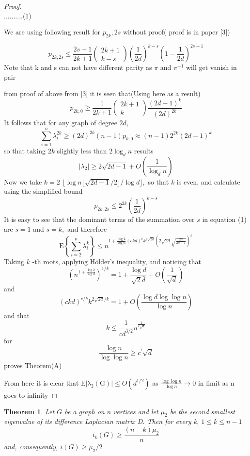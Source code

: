 \documentclass[oneside]{book}
\newtheorem{theorem}{Theorem}[section]
\begin{document}
\begin{proof}
$$		$$    ..........(1)\par
		We are using following result for $p_{2k},{2s}$ without proof( proof is in paper [3])  \par
		$$
		p_{2 k, 2 s} \leq \frac{2 s+1}{2 k+1}\left(\begin{array}{c}
		2 k+1 \\
		k-s
		\end{array}\right)\left(\frac{1}{2 d}\right)^{k-s}\left(1-\frac{1}{2 d}\right)^{2 s-1}
		$$
		Note that k and s can not have different parity as  $\pi$ and $\pi^{-1}$ will get vanish in pair\par
		from proof of above from [3] it is seen that(Using here as a result)  
		$$ p_{2 k, 0} \geq \frac{1}{2 k+1}\left(\begin{array}{c}
		2 k+1 \\
		k
		\end{array}\right) \frac{(2 d-1)^{k}}{(2 d)^{2 k}}$$
		It follows that for any graph of degree $2 d$,
		$$
		\sum_{i=1}^{n} \lambda_{i}^{2 k} \geq(2 d)^{2 k}(n-1) p_{k, 0} \approx(n-1) 2^{2 k}(2 d-1)^{k}
		$$
		so that taking $2 k$ slightly less than $2 \log _{d} n$ results 
		$$
		\left|\lambda_{2}\right| \geq 2 \sqrt{2 d-1}+O\left(\frac{1}{\log _{d} n}\right)
		$$
		Now we take $k=2$ $\lfloor\log n\lfloor\sqrt{2 d-1} / 2\rfloor / \log d\rfloor,$ so that $k$ is even, and calculate
		using the simplified bound
		$$
		p_{2 k, 2 s} \leq 2^{2 k}\left(\frac{1}{2 d}\right)^{k-s}
		$$
		It is easy to see that the dominant terms of the summation over $s$ in equation (1) are $s=1$ and $s=k,$ and therefore
		$$
		\mathrm{E}\left\{\sum_{i=2}^{n} \lambda_{i}^{k}\right\} \leq n^{1+\frac{\log 2}{\log \alpha}(c k d)^{c} k^{2 \sqrt{2 d}}(2 \sqrt{2 d} \sqrt{\frac{2 d}{2 d-1}})^{k}}
		$$
		Taking $k$ -th roots, applying Hölder's  inequality, and noticing that
		$$
		\left(n^{1+\frac{\log 2}{\log d}}\right)^{1 / k}=1+\frac{\log d}{\sqrt{2} \bar{d}}+O\left(\frac{1}{\sqrt{d}}\right)
		$$
		and 
		$$
		(c k d)^{c / k} k^{2 \sqrt{2 d} / k}=1+O\left(\frac{\log d \log \log n}{\log n}\right)
		$$
		and that
		$$
		k \leq \frac{1}{c d^{3 / 2}} n^{\frac{1}{c \sqrt{a}}}
		$$
		for
		$$
		\frac{\log n}{\log \log n} \geq c^{\prime} \sqrt{d}
		$$
		proves Theorem(A)  \par 
		From here it is clear that $\mathrm{E|\lambda_{2}(G)|} \leq O(d^{1/2})$ as $\frac{ \log \log n}{\log n}\rightarrow 0$ in limit  as n goes to  infinity 
	\end{proof} 
	\begin{theorem} 
		\label{t:14}
		Let $G$ be a graph on $n$ vertices and let $\mu_{2}$ be the second smallest eigenvalue of its difference Laplacian matrix D. Then for every k, 
		$1 \leq k \leq n-1$
		$$
		i_{k}(G) \geq \frac{(n-k) \mu_{2}}{n}
		$$
		and, consequently, $i(G) \geq \mu_{2} / 2$ \par
	\end{theorem} 
\end{document}
